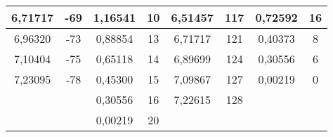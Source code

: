 \documentclass[a4paper,12pt]{article}
\numberwithin{equation}{section}
\begin{document}
\begin{appendices}
\begin{longtable}[c]{|c|c|c|c|c|c|c|c|}
6,71717	&	-69	&	1,16541	&	10	&		6,51457	&	117	&	0,72592	&	16	\\\hline
6,96320	&	-73	&	0,88854	&	13	&		6,71717	&	121	&	0,40373	&	8	\\\hline
7,10404	&	-75	&	0,65118	&	14	&		6,89699	&	124	&	0,30556	&	6	\\\hline
7,23095	&	-78	&	0,45300	&	15	&		7,09867	&	127	&	0,00219	&	0	\\\hline
 \multicolumn{2}{|c|}{}	&	0,30556	&	16	&		7,22615	&	128	&	 \multicolumn{2}{c|}{}\\\cline{3-6}
 \multicolumn{2}{|c|}{}	&	0,00219	&	20	&	 \multicolumn{4}{c|}{}\\\hline
\end{longtable}

\newpage


\end{appendices}
\end{document}
